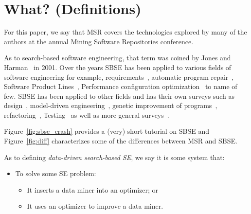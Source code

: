 \documentclass[sigconf,anonymous,review]{acmart}
\newcommand\TODO[1]{\textcolor{ScarletRed}{\textbf{\colorbox{yellow}{\small TODO:}} \emph{#1}}\xspace}
\begin{document}


\section{What? (Definitions)}

For this paper, we say that MSR covers the technologies
explored by many of the authors at the annual Mining Software Repositories
conference.

As to search-based software engineering, that term was coined by Jones and Harman~\cite{harman2001search} in 2001.
Over the years SBSE has been applied to various fields of software engineering for example, requirements~\cite{ZhangHL13, chen2017beyond}, automatic program repair~\cite{le2012genprog}, Software Product Lines~\cite{chen2017sampling, sayyad13a, guo2017smtibea}, Performance configuration optimization~\cite{nair2017faster,nair2017using, guo2017data, oh2017finding, nair2018finding} to name of few. SBSE has been applied to other fields and has their own surveys such as design~\cite{raiha2010survey}, model-driven engineering~\cite{boussaid2017survey}, genetic improvement of programs~\cite{petke2017genetic}, refactoring~\cite{mariani2017systematic}, Testing~\cite{silva2017systematic, khari2017extensive} as well as more general surveys~\cite{clarke2003reformulating, harman2007current}. 

 Figure~\ref{fig:sbse_crash} provides a (very) short tutorial on SBSE and  Figure~\ref{fig:diff} characterizes some of the differences between MSR 
and SBSE.
 
As to defining {\em data-driven search-based SE},
we say it is some system that:
\begin{itemize}
\item To solve  some SE problem:
\begin{itemize}
\item
It inserts  a data miner into an optimizer; or
\item
It uses an optimizer  to improve a data  miner.
\end{itemize}
\end{itemize}
\end{document}
